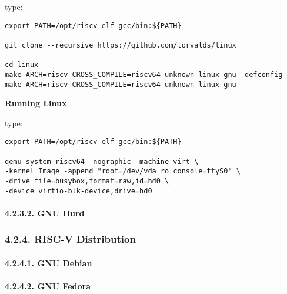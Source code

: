 \documentclass[]{article}
\let\oldparagraph\paragraph
\renewcommand{\paragraph}[1]{\oldparagraph{#1}\mbox{}}
\begin{document}
type:

\begin{verbatim}
export PATH=/opt/riscv-elf-gcc/bin:${PATH}

git clone --recursive https://github.com/torvalds/linux

cd linux
make ARCH=riscv CROSS_COMPILE=riscv64-unknown-linux-gnu- defconfig
make ARCH=riscv CROSS_COMPILE=riscv64-unknown-linux-gnu-
\end{verbatim}

\textbf{Running Linux}

type:

\begin{verbatim}
export PATH=/opt/riscv-elf-gcc/bin:${PATH}

qemu-system-riscv64 -nographic -machine virt \
-kernel Image -append "root=/dev/vda ro console=ttyS0" \
-drive file=busybox,format=raw,id=hd0 \
-device virtio-blk-device,drive=hd0
\end{verbatim}

\hypertarget{gnu-hurd}{%
\paragraph{4.2.3.2. GNU Hurd}\label{gnu-hurd}}

\hypertarget{risc-v-distribution}{%
\subsubsection{4.2.4. RISC-V Distribution}\label{risc-v-distribution}}

\hypertarget{gnu-debian}{%
\paragraph{4.2.4.1. GNU Debian}\label{gnu-debian}}

\hypertarget{gnu-fedora}{%
\paragraph{4.2.4.2. GNU Fedora}\label{gnu-fedora}}
\end{document}
